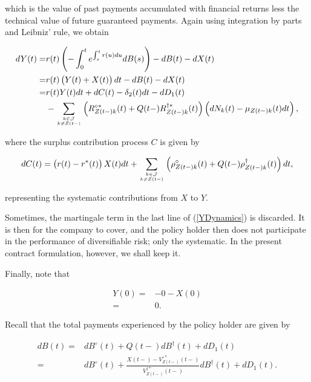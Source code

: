 \documentclass{article}
\newcommand{\1}[1]{\mathbbm{1}_{\left\lbrace #1 \right\rbrace}}
\theoremstyle{break}
\theoremstyle{remark}
\newenvironment{remark}
  {\pushQED{\qed}\renewcommand{\qedsymbol}{\scalebox{1.4}{$\circ$}}\remarkx}
  {\popQED\endremarkx}
\numberwithin{equation}{section}
\begin{document}
which is the value of past payments accumulated with financial returns less the technical value of future guaranteed payments. Again using integration by parts and Leibniz' rule, we obtain

\begin{align} \label{YDynamics}
\begin{split}
	dY(t) =& r(t) \left( - \int_0^t e^{\int_s^t r(u) du} dB(s) \right) - dB(t) - dX(t) \\
	=& r(t) \left( Y(t) + X(t) \right)dt - dB(t) - dX(t) \\
	=& r(t) Y(t) dt + dC(t) - \delta_2(t)dt - dD_1(t) \\
	&- \sum_{k \in \mathcal{J} \atop k \neq Z(t-)} \left( R_{Z(t-)k}^{\circ*}(t) + Q(t-) R_{Z(t-)k}^{\dagger*}(t) \right) \left( dN_k(t) - \mu_{Z(t-)k}(t) dt \right),
\end{split}
\end{align}

 where the surplus contribution process $C$ is given by

\begin{align*}
	dC(t) = \left( r(t) - r^*(t) \right) X(t) dt + \sum_{k \in \mathcal{J} \atop k \neq Z(t-)} \left( \rho_{Z(t-)k}^\circ(t) + Q(t-) \rho_{Z(t-)k}^\dagger(t) \right) dt,
\end{align*}

representing the systematic contributions from $X$ to $Y$.

\begin{remark}
	Sometimes, the martingale term in the last line of (\ref{YDynamics}) is discarded. It is then for the company to cover, and the policy holder then does not participate in the performance of diversifiable risk; only the systematic. In the present contract formulation, however, we shall keep it.
\end{remark}

Finally, note that

\begin{align*}
	Y(0) =& - 0 - X(0) \\
	=& 0.
\end{align*}

Recall that the total payments experienced by the policy holder are given by

\begin{align*}
dB(t) =& dB^\circ(t) + Q(t-) dB^\dagger(t) + dD_1(t)\\
=& dB^\circ(t) + \frac{X(t-) - V_{Z(t-)}^{\circ*}(t-)}{V_{Z(t-)}^{\dagger*}(t-)} dB^\dagger(t) + dD_1(t).
\end{align*}
\end{document}
